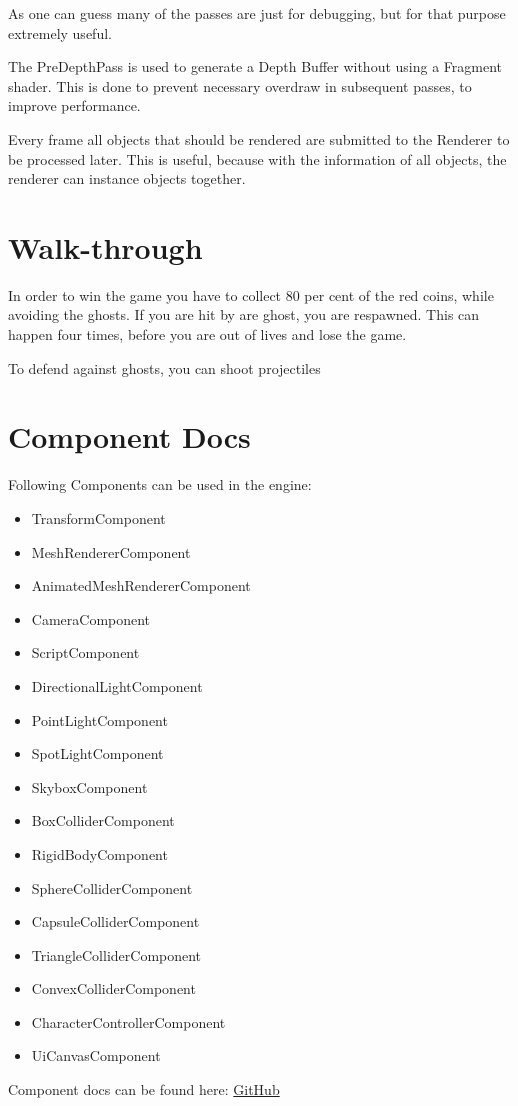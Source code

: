 \documentclass{article}
\begin{document}
    As one can guess many of the passes are just for debugging, but for that purpose extremely useful.

    The PreDepthPass is used to generate a Depth Buffer without using a Fragment shader. This is done to prevent necessary overdraw in subsequent passes, to improve performance.

    Every frame all objects that should be rendered are submitted to the Renderer to be processed later. This is useful, because with the information of all objects, the renderer can instance objects together.

    \section{Walk-through}

    In order to win the game you have to collect 80 per cent of the red coins, while avoiding the ghosts. If you are hit by are ghost, you are respawned. This can happen four times, before you are out of lives and lose the game.

    To defend against ghosts, you can shoot projectiles

    \section{Component Docs}
    \label{sec:compDocs}

    Following Components can be used in the engine:

    \begin{itemize}
        \item TransformComponent
        \item MeshRendererComponent
        \item AnimatedMeshRendererComponent
        \item CameraComponent
        \item ScriptComponent
        \item DirectionalLightComponent
        \item PointLightComponent
        \item SpotLightComponent
        \item SkyboxComponent
        \item BoxColliderComponent
        \item RigidBodyComponent
        \item SphereColliderComponent
        \item CapsuleColliderComponent
        \item TriangleColliderComponent
        \item ConvexColliderComponent
        \item CharacterControllerComponent
        \item UiCanvasComponent
    \end{itemize}

    Component docs can be found here: \href{https://github.com/Liioooo/cgue23-pac3D/blob/master/docs/md/COMPONENTS_DOCS.md}{GitHub}
\end{document}
